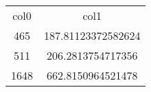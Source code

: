 \begin{table}
\begin{tabular}{cc}
col0 & col1 \\
465 & 187.81123372582624 \\
511 & 206.2813754717356 \\
1648 & 662.8150964521478 \\
\end{tabular}
\end{table}
